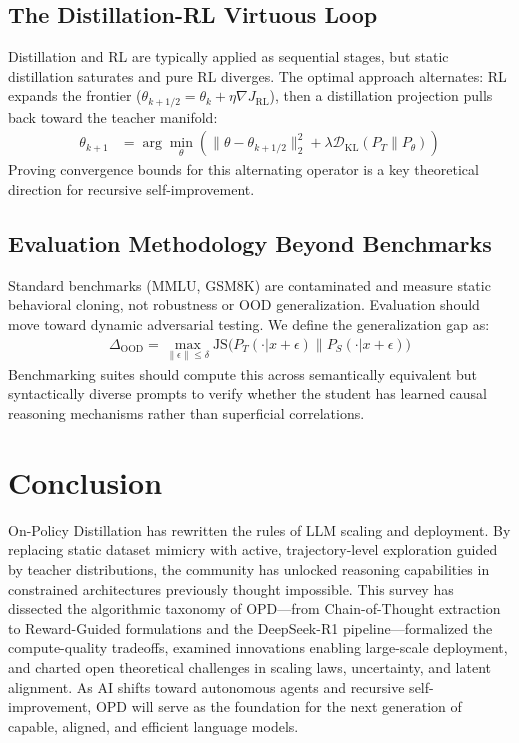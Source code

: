 \documentclass{article} %
\begin{document}
\subsection{The Distillation-RL Virtuous Loop}
Distillation and RL are typically applied as sequential stages, but static distillation saturates and pure RL diverges. The optimal approach alternates: RL expands the frontier ($\theta_{k+1/2} = \theta_k + \eta \nabla J_{\text{RL}}$), then a distillation projection pulls back toward the teacher manifold:
\begin{align}
\theta_{k+1} &= \arg\min_{\theta} \left( \parallel \theta - \theta_{k+1/2} \parallel_2^2 + \lambda \mathcal{D}_{\text{KL}}(P_T \parallel P_\theta) \right)
\end{align}
Proving convergence bounds for this alternating operator is a key theoretical direction for recursive self-improvement.

\subsection{Evaluation Methodology Beyond Benchmarks}
Standard benchmarks (MMLU, GSM8K) are contaminated and measure static behavioral cloning, not robustness or OOD generalization. Evaluation should move toward dynamic adversarial testing. We define the generalization gap as:
\begin{align}
\Delta_{\text{OOD}} = \max_{\parallel \epsilon \parallel \le \delta} \text{JS}\Big( P_T(\cdot | x + \epsilon) \parallel P_S(\cdot | x + \epsilon) \Big)
\end{align}
Benchmarking suites should compute this across semantically equivalent but syntactically diverse prompts to verify whether the student has learned causal reasoning mechanisms rather than superficial correlations.



\section{Conclusion}
\label{sec:conclusion}
On-Policy Distillation has rewritten the rules of LLM scaling and deployment. By replacing static dataset mimicry with active, trajectory-level exploration guided by teacher distributions, the community has unlocked reasoning capabilities in constrained architectures previously thought impossible. This survey has dissected the algorithmic taxonomy of OPD---from Chain-of-Thought extraction to Reward-Guided formulations and the DeepSeek-R1 pipeline---formalized the compute-quality tradeoffs, examined innovations enabling large-scale deployment, and charted open theoretical challenges in scaling laws, uncertainty, and latent alignment. As AI shifts toward autonomous agents and recursive self-improvement, OPD will serve as the foundation for the next generation of capable, aligned, and efficient language models.
\end{document}
